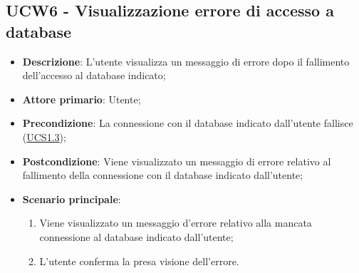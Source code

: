 \subsection{UCW6 - Visualizzazione errore di accesso a database}
\label{sub:ucw6}
\begin{itemize}
    \item \textbf{Descrizione}: L'utente visualizza un messaggio di errore dopo il fallimento dell'accesso
    al database indicato;

    \item \textbf{Attore primario}: Utente;
    
    \item \textbf{Precondizione}:   La connessione con il database indicato dall'utente fallisce 
    (\hyperref[ssub:ucs1.3]{UCS1.3});

    \item \textbf{Postcondizione}:  Viene visualizzato un messaggio di errore relativo al fallimento della connessione 
    con il database indicato dall'utente;

    \item \textbf{Scenario principale}:
    \begin{enumerate}
        \item Viene visualizzato un messaggio d'errore relativo alla mancata connessione al database indicato dall'utente;
        \item L'utente conferma la presa visione dell'errore.
    \end{enumerate}
\end{itemize}